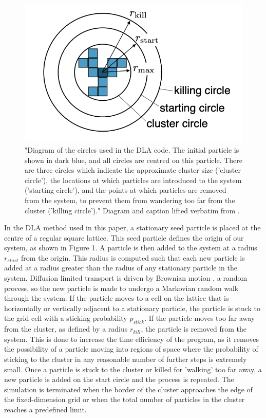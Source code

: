 \documentclass[11pt]{iopart}
\begin{document}
\begin{figure}[b]
  \centering
  \includegraphics[width=0.4\linewidth]{images/circles.png}
  \caption{"Diagram of the circles used in the DLA code. The initial particle is shown in dark blue, and all circles are centred on this particle. There are three circles which indicate the approximate cluster size ('cluster circle'), the locations at which particles are introduced to the system ('starting circle'), and the points at which particles are removed from the system, to prevent them from wandering too far from the cluster ('killing circle')." Diagram and caption lifted verbatim from \cite{handout}.}
  \label{fig:circles}
\end{figure}

In the DLA method used in this paper, a stationary seed particle is placed at the centre of a regular square lattice. This seed particle defines the origin of our system, as shown in Figure 1. A particle is then added to the system at a radius $r_{start}$ from the origin. This radius is computed such that each new particle is added at a radius greater than the radius of any stationary particle in the system. Diffusion limited transport is driven by Brownian motion \cite{brownian}, a random process, so the new particle is made to undergo a Markovian random walk through the system. If the particle moves to a cell on the lattice that is horizontally or vertically adjacent to a stationary particle, the particle is stuck to the grid cell with a sticking probability $p_{stick}$. If the particle moves too far away from the cluster, as defined by a radius $r_{kill}$, the particle is removed from the system. This is done to increase the time efficiency of the program, as it removes the possibility of a particle moving into regions of space where the probability of sticking to the cluster in any reasonable number of further steps is extremely small. Once a particle is stuck to the cluster or killed for 'walking' too far away, a new particle is added on the start circle and the process is repeated. The simulation is terminated when the border of the cluster approaches the edge of the fixed-dimension grid or when the total number of particles in the cluster reaches a predefined limit.
\end{document}
